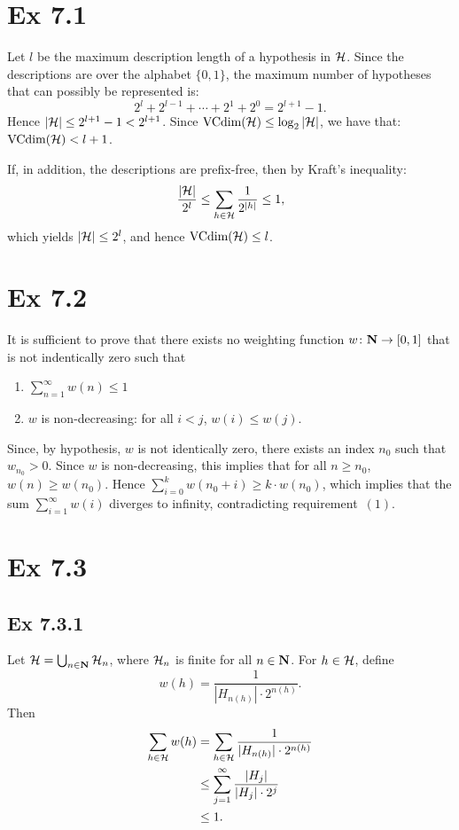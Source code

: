 \section*{Ex 7.1}

Let $l$ be the maximum description length of a hypothesis in $\mathcal{H}$. Since
the descriptions are over the alphabet $\{0, 1\}$, the maximum number of hypotheses
that can possibly be represented is:
\[
    2^{l} + 2^{l - 1} + \cdots + 2^1 + 2^0 = 2^{l + 1} - 1.
\]
Hence $|\mathcal{H}| \leq 2^{l + 1} - 1 < 2^{l + 1}$. Since 
$\text{VCdim} (\mathcal{H}) \leq \log_2 |\mathcal{H}|$, we have that:
$\text{VCdim} (\mathcal{H}) < l + 1$.

If, in addition, the descriptions are prefix-free, then by Kraft's 
inequality:
\[
    \frac{|\mathcal{H}|}{2^l} \leq \sum_{h \in \mathcal{H}} \frac{1}{2^{|h|}} \leq 1,
\]
which yields $|\mathcal{H}| \leq 2^l$, and hence $\text{VCdim} (\mathcal{H}) \leq l$.

\section*{Ex 7.2}

It is sufficient to prove that there exists no weighting function 
$w \colon \mathbf{N} \rightarrow [0, 1]$ that is not indentically zero such that
\begin{enumerate}
    \item $\sum_{n = 1}^{\infty} w(n) \leq 1$
    \item $w$ is non-decreasing: for all $i < j$, $w(i) \leq w(j)$.
\end{enumerate}
Since, by hypothesis, $w$ is not identically zero, there exists an index $n_0$ 
such that $w_{n_0} > 0$. Since $w$ is non-decreasing, this implies that for 
all $n \geq n_0$, $w(n) \geq w(n_0)$. Hence 
$\sum_{i = 0}^{k} w( n_0 + i ) \geq k \cdot w( n_0 )$, which implies that 
the sum $\sum_{i = 1}^{\infty} w(i)$ diverges to infinity, contradicting 
requirement~$(1)$.

\section*{Ex 7.3}

\subsection*{Ex 7.3.1}

Let $\mathcal{H} = \bigcup_{n \in \mathbf{N}} \mathcal{H}_n$, where $\mathcal{H}_n$ is finite 
for all $n \in \mathbf{N}$. For $h \in \mathcal{H}$, define 
\[
    w(h) = \frac{1}{|H_{ n(h) }| \cdot 2^{ n(h) }}.
\]
Then 
\begin{align*}
\sum_{h \in \mathcal{H}} w(h) & = \sum_{h \in \mathcal{H}} \frac{1}{|H_{ n(h) }| \cdot 2^{ n(h) }} \\
    & \leq \sum_{j = 1}^{\infty} \frac{|H_j|}{|H_j| \cdot 2^j} \\
    & \leq 1.
\end{align*}


